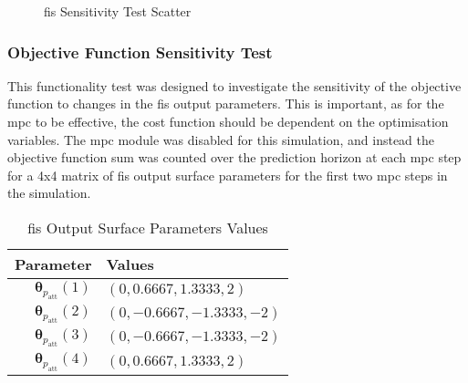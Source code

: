 \documentclass[conference]{IEEEtran}
\begin{document}
\begin{figure*}
    \centering
    
    \caption{\gls{fis} Sensitivity Test Scatter}
    \label{fig:SF02_scatter}
\end{figure*}

%     

\subsubsection{Objective Function Sensitivity Test}

This functionality test was designed to investigate the sensitivity of the objective function to changes in the \gls{fis} output parameters.
This is important, as for the \gls{mpc} to be effective, the cost function should be dependent on the optimisation variables.
The \gls{mpc} module was disabled for this simulation, and instead the objective function sum was counted over the prediction horizon at each \gls{mpc} step for a 4x4 matrix of \gls{fis} output surface parameters for the first two \gls{mpc} steps in the simulation.

\begin{table}[]
    \centering
    \caption{\gls{fis} Output Surface Parameters Values}
    \label{tab:SF03}
    \begin{tabular}{r|l}
        \toprule
        Parameter & Values \\
        \midrule
        $\bm{\theta}_{p_{\text{att}}}(1)$ & $(0, 0.6667, 1.3333, 2)$ \\
        $\bm{\theta}_{p_{\text{att}}}(2)$ & $(0, -0.6667, -1.3333, -2)$ \\
        $\bm{\theta}_{p_{\text{att}}}(3)$ & $(0, -0.6667, -1.3333, - 2)$ \\
        $\bm{\theta}_{p_{\text{att}}}(4)$ & $(0, 0.6667, 1.3333, 2)$ \\
        \bottomrule
    \end{tabular}
\end{table}
\end{document}
